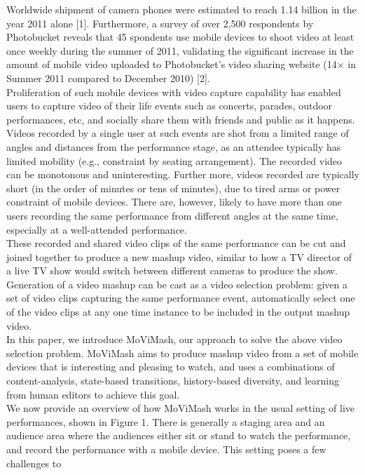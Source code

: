 \documentclass{sig-alternate}
\providecommand{\DIFaddend}{} %
\begin{document}
\DIFaddend Worldwide shipment of camera phones were estimated to reach
1.14 billion in the year 2011 alone [1]. Furthermore, a survey of
over 2,500 respondents by Photobucket reveals that 45%
spondents use mobile devices to shoot video at least once weekly
during the summer of 2011, validating the significant increase in
the amount of mobile video uploaded to Photobucket’s video sharing website (14× in Summer 2011 compared to December 2010) [2].\\
Proliferation of such mobile devices with video capture capability has enabled users to capture video of their life events such
as concerts, parades, outdoor performances, etc, and socially share
them with friends and public as it happens. Videos recorded by
a single user at such events are shot from a limited range of angles and distances from the performance stage, as an attendee typically has limited mobility (e.g., constraint by seating arrangement).
The recorded video can be monotonous and uninteresting. Further more, videos recorded are typically short (in the order of minutes
or tens of minutes), due to tired arms or power constraint of mobile
devices. There are, however, likely to have more than one users
recording the same performance from different angles at the same
time, especially at a well-attended performance.\\
These recorded and shared video clips of the same performance
can be cut and joined together to produce a new mashup video,
similar to how a TV director of a live TV show would switch between different cameras to produce the show. Generation of a video
mashup can be cast as a video selection problem: given a set of
video clips capturing the same performance event, automatically
select one of the video clips at any one time instance to be included
in the output mashup video.\\
In this paper, we introduce MoViMash, our approach to solve
the above video selection problem. MoViMash aims to produce
mashup video from a set of mobile devices that is interesting and
pleasing to watch, and uses a combinations of content-analysis,
state-based transitions, history-based diversity, and learning from
human editors to achieve this goal.\\
We now provide an overview of how MoViMash works in the
usual setting of live performances, shown in Figure 1. There is
generally a staging area and an audience area where the audiences
either sit or stand to watch the performance, and record the performance with a mobile device. This setting poses a few challenges to
\end{document}
